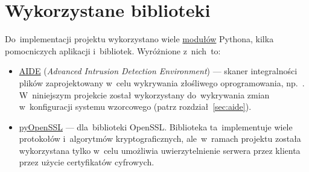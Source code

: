 \documentclass[thesis]{subfiles}
\begin{document}

\section{Wykorzystane biblioteki}

Do~implementacji projektu wykorzystano wiele \href{https://docs.python.org/dev/tutorial/modules.html}{modułów} Pythona, kilka pomocniczych aplikacji i~bibliotek. Wyróżnione z~nich~to:
\begin{itemize}
	\item \href{http://aide.sourceforge.net/}{AIDE} (\emph{Advanced Intrusion Detection Environment}) --- skaner integralności plików zaprojektowany w~celu wykrywania złośliwego oprogramowania, np.~. W~niniejszym projekcie został wykorzystany do~wykrywania zmian w~konfiguracji systemu wzorcowego (patrz rozdział~\ref{sec:aide}).
	\item \href{http://www.pyopenssl.org/}{pyOpenSSL} ---  dla~biblioteki OpenSSL. Biblioteka ta~implementuje wiele protokołów i~algorytmów kryptograficznych, ale~w~ramach projektu została wykorzystana tylko w~celu umożliwia uwierzytelnienie serwera przez klienta przez użycie certyfikatów cyfrowych.

\end{itemize}
\end{document}
